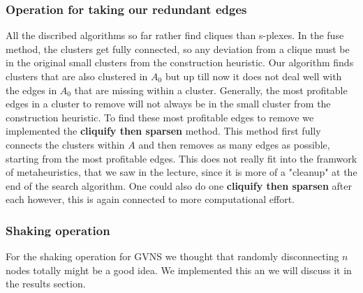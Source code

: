 \subsubsection{Operation for taking our redundant edges}
\label{sec:cliquify}
All the discribed algorithms so far rather find cliques than s-plexes. In the fuse method, the clusters get 
fully connected, so any deviation from a clique must be in the original small clusters from the construction 
heuristic. Our algorithm finds clusters that are also clustered in $A_0$ but up till now it does not deal well 
with the edges in $A_0$ that are missing within a cluster. Generally, the most profitable edges in a cluster 
to remove will not always be in the small cluster from the construction heuristic. To find these most profitable 
edges to remove we implemented the \textbf{cliquify then sparsen} method. This method first fully connects the 
clusters within $A$ and then removes as many edges as possible, starting from the most profitable edges. This 
does not really fit into the framwork of metaheuristics, that we saw in the lecture, since it is more of a 
"cleanup" at the end of the search algorithm. One could also do one \textbf{cliquify then sparsen} after each 
however, this is again connected to more computational effort.\\

\subsubsection{Shaking operation}  
For the shaking operation for GVNS we thought that randomly disconnecting $n$ nodes totally might be a good idea. 
We implemented this an we will discuss it in the results section.\\

